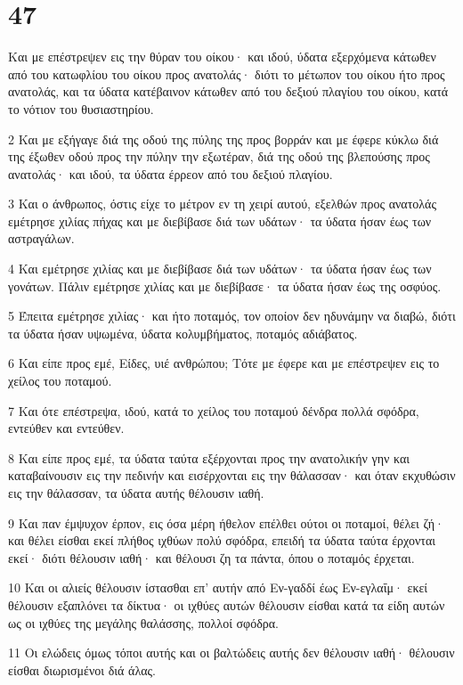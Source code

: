 \chapter{47}

\par Και με επέστρεψεν εις την θύραν του οίκου· και ιδού, ύδατα εξερχόμενα κάτωθεν από του κατωφλίου του οίκου προς ανατολάς· διότι το μέτωπον του οίκου ήτο προς ανατολάς, και τα ύδατα κατέβαινον κάτωθεν από του δεξιού πλαγίου του οίκου, κατά το νότιον του θυσιαστηρίου.
\par 2 Και με εξήγαγε διά της οδού της πύλης της προς βορράν και με έφερε κύκλω διά της έξωθεν οδού προς την πύλην την εξωτέραν, διά της οδού της βλεπούσης προς ανατολάς· και ιδού, τα ύδατα έρρεον από του δεξιού πλαγίου.
\par 3 Και ο άνθρωπος, όστις είχε το μέτρον εν τη χειρί αυτού, εξελθών προς ανατολάς εμέτρησε χιλίας πήχας και με διεβίβασε διά των υδάτων· τα ύδατα ήσαν έως των αστραγάλων.
\par 4 Και εμέτρησε χιλίας και με διεβίβασε διά των υδάτων· τα ύδατα ήσαν έως των γονάτων. Πάλιν εμέτρησε χιλίας και με διεβίβασε· τα ύδατα ήσαν έως της οσφύος.
\par 5 Έπειτα εμέτρησε χιλίας· και ήτο ποταμός, τον οποίον δεν ηδυνάμην να διαβώ, διότι τα ύδατα ήσαν υψωμένα, ύδατα κολυμβήματος, ποταμός αδιάβατος.
\par 6 Και είπε προς εμέ, Είδες, υιέ ανθρώπου; Τότε με έφερε και με επέστρεψεν εις το χείλος του ποταμού.
\par 7 Και ότε επέστρεψα, ιδού, κατά το χείλος του ποταμού δένδρα πολλά σφόδρα, εντεύθεν και εντεύθεν.
\par 8 Και είπε προς εμέ, τα ύδατα ταύτα εξέρχονται προς την ανατολικήν γην και καταβαίνουσιν εις την πεδινήν και εισέρχονται εις την θάλασσαν· και όταν εκχυθώσιν εις την θάλασσαν, τα ύδατα αυτής θέλουσιν ιαθή.
\par 9 Και παν έμψυχον έρπον, εις όσα μέρη ήθελον επέλθει ούτοι οι ποταμοί, θέλει ζή· και θέλει είσθαι εκεί πλήθος ιχθύων πολύ σφόδρα, επειδή τα ύδατα ταύτα έρχονται εκεί· διότι θέλουσιν ιαθή· και θέλουσι ζη τα πάντα, όπου ο ποταμός έρχεται.
\par 10 Και οι αλιείς θέλουσιν ίστασθαι επ' αυτήν από Εν-γαδδί έως Εν-εγλαΐμ· εκεί θέλουσιν εξαπλόνει τα δίκτυα· οι ιχθύες αυτών θέλουσιν είσθαι κατά τα είδη αυτών ως οι ιχθύες της μεγάλης θαλάσσης, πολλοί σφόδρα.
\par 11 Οι ελώδεις όμως τόποι αυτής και οι βαλτώδεις αυτής δεν θέλουσιν ιαθή· θέλουσιν είσθαι διωρισμένοι διά άλας.
